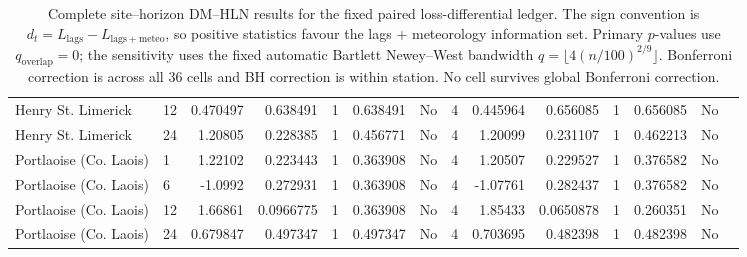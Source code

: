\begin{table}[p]
{\begin{tabular}{llrrrrrrrrrrrr}
Henry St. Limerick & 12 & 0.470497 & 0.638491 & 1 & 0.638491 & No & 4 & 0.445964 & 0.656085 & 1 & 0.656085 & No \\
Henry St. Limerick & 24 & 1.20805 & 0.228385 & 1 & 0.456771 & No & 4 & 1.20099 & 0.231107 & 1 & 0.462213 & No \\
Portlaoise (Co. Laois) & 1 & 1.22102 & 0.223443 & 1 & 0.363908 & No & 4 & 1.20507 & 0.229527 & 1 & 0.376582 & No \\
Portlaoise (Co. Laois) & 6 & -1.0992 & 0.272931 & 1 & 0.363908 & No & 4 & -1.07761 & 0.282437 & 1 & 0.376582 & No \\
Portlaoise (Co. Laois) & 12 & 1.66861 & 0.0966775 & 1 & 0.363908 & No & 4 & 1.85433 & 0.0650878 & 1 & 0.260351 & No \\
Portlaoise (Co. Laois) & 24 & 0.679847 & 0.497347 & 1 & 0.497347 & No & 4 & 0.703695 & 0.482398 & 1 & 0.482398 & No \\
\bottomrule\end{tabular}}
\caption{Complete site--horizon DM--HLN results for the fixed paired loss-differential ledger. The sign convention is $d_t=L_{\mathrm{lags}}-L_{\mathrm{lags+meteo}}$, so positive statistics favour the lags + meteorology information set. Primary $p$-values use $q_{\mathrm{overlap}}=0$; the sensitivity uses the fixed automatic Bartlett Newey--West bandwidth $q=\lfloor4(n/100)^{2/9}\rfloor$. Bonferroni correction is across all 36 cells and BH correction is within station. No cell survives global Bonferroni correction.}\label{tab:s1_dm_full}
\end{table}
